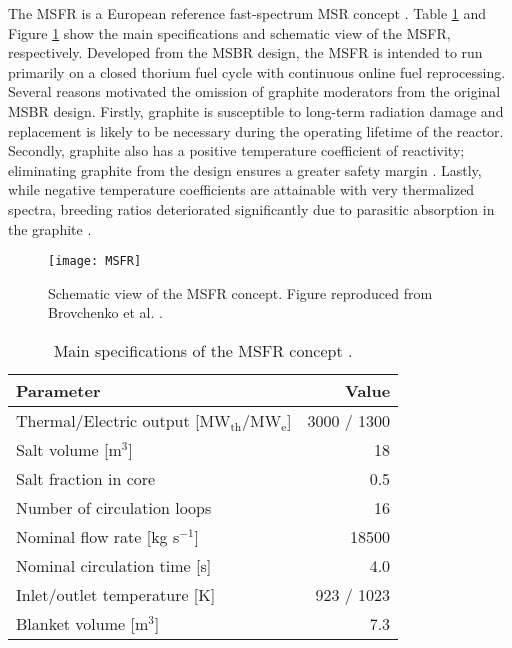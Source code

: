 The \gls{MSFR} is a European reference fast-spectrum \gls{MSR} concept
\cite{mathieu_thorium_2006, merle_optimized_2007}. Table \ref{table:msfr} and
Figure \ref{fig:msfr} show the main specifications and schematic view of the
\gls{MSFR}, respectively. Developed from the \gls{MSBR} design, the
\gls{MSFR} is intended to run primarily on a closed thorium fuel cycle with
continuous online fuel reprocessing. Several reasons motivated the omission of
graphite moderators from the original \gls{MSBR} design. Firstly, graphite is
susceptible to
long-term radiation damage and replacement is likely to be necessary during
the operating lifetime of the reactor. Secondly, graphite also has a positive
temperature coefficient of reactivity; eliminating graphite from the design
ensures a greater safety margin \cite{mathieu_thorium_2006}. Lastly, while
negative temperature coefficients are attainable with very thermalized
spectra, breeding ratios deteriorated significantly due to parasitic
absorption in the graphite \cite{mathieu_thorium_2006}.
%
\begin{figure}[htb!] 
	\centering
	\texttt{[image: MSFR]}
	\caption{Schematic view of the MSFR concept. Figure reproduced from
	Brovchenko et al. \cite{brovchenko_design-related_2013}.}
	\label{fig:msfr}
\end{figure}
%
\begin{table}[htb!]
    \small
	\caption{Main specifications of the \gls{MSFR} concept
				\cite{merle_concept_2017}.}
	\centering
	\begin{tabular}{ l r }
		\toprule
		Parameter & Value \\
		\midrule
		Thermal/Electric output [MW$_{\text{th}}$/MW$_{\text{e}}$] & 3000 /
		1300 
		\\
		Salt volume [m$^3$] & 18 \\
		Salt fraction in core & 0.5 \\
		Number of circulation loops & 16 \\
		Nominal flow rate [kg s$^{-1}$] & 18500  \\
		Nominal circulation time [s] & 4.0 \\
		Inlet/outlet temperature [K] & 923 / 1023 \\
		Blanket volume [m$^3$] & 7.3\\
		\bottomrule
	\end{tabular}
	\label{table:msfr}
\end{table}

